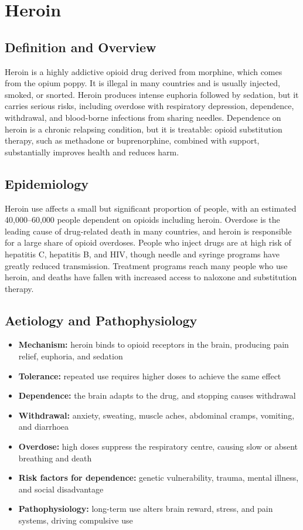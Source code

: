 \chapter{Heroin}

\section*{Definition and Overview}
Heroin is a highly addictive opioid drug derived from morphine, which comes from the opium poppy. It is illegal in many countries and is usually injected, smoked, or snorted. Heroin produces intense euphoria followed by sedation, but it carries serious risks, including overdose with respiratory depression, dependence, withdrawal, and blood-borne infections from sharing needles. Dependence on heroin is a chronic relapsing condition, but it is treatable: opioid substitution therapy, such as methadone or buprenorphine, combined with support, substantially improves health and reduces harm.

\section*{Epidemiology}
Heroin use affects a small but significant proportion of people, with an estimated 40,000--60,000 people dependent on opioids including heroin. Overdose is the leading cause of drug-related death in many countries, and heroin is responsible for a large share of opioid overdoses. People who inject drugs are at high risk of hepatitis C, hepatitis B, and HIV, though needle and syringe programs have greatly reduced transmission. Treatment programs reach many people who use heroin, and deaths have fallen with increased access to naloxone and substitution therapy.

\section*{Aetiology and Pathophysiology}
\begin{itemize}
    \item \textbf{Mechanism:} heroin binds to opioid receptors in the brain, producing pain relief, euphoria, and sedation
    \item \textbf{Tolerance:} repeated use requires higher doses to achieve the same effect
    \item \textbf{Dependence:} the brain adapts to the drug, and stopping causes withdrawal
    \item \textbf{Withdrawal:} anxiety, sweating, muscle aches, abdominal cramps, vomiting, and diarrhoea
    \item \textbf{Overdose:} high doses suppress the respiratory centre, causing slow or absent breathing and death
    \item \textbf{Risk factors for dependence:} genetic vulnerability, trauma, mental illness, and social disadvantage
    \item \textbf{Pathophysiology:} long-term use alters brain reward, stress, and pain systems, driving compulsive use
\end{itemize}

